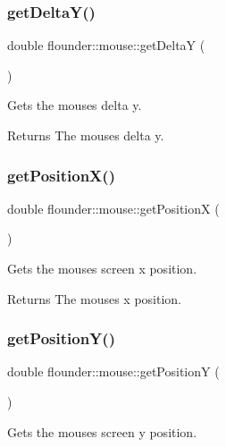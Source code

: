 \subsubsection{\texorpdfstring{get\+Delta\+Y()}{getDeltaY()}}
{\footnotesize\ttfamily double flounder\+::mouse\+::get\+DeltaY (\begin{DoxyParamCaption}{ }\end{DoxyParamCaption})}



Gets the mouses delta y. 

\begin{DoxyReturn}{Returns}
The mouses delta y. 
\end{DoxyReturn}
\mbox{\label{classflounder_1_1mouse_ab1f034dd18edcd5099615b7a1958b71d}} 
\subsubsection{\texorpdfstring{get\+Position\+X()}{getPositionX()}}
{\footnotesize\ttfamily double flounder\+::mouse\+::get\+PositionX (\begin{DoxyParamCaption}{ }\end{DoxyParamCaption})}



Gets the mouses screen x position. 

\begin{DoxyReturn}{Returns}
The mouses x position. 
\end{DoxyReturn}
\mbox{\label{classflounder_1_1mouse_adbb426aed882bf8919171e263bd038f3}} 
\subsubsection{\texorpdfstring{get\+Position\+Y()}{getPositionY()}}
{\footnotesize\ttfamily double flounder\+::mouse\+::get\+PositionY (\begin{DoxyParamCaption}{ }\end{DoxyParamCaption})}



Gets the mouses screen y position. 

